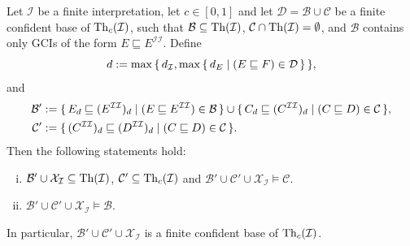 \begin{Theorem}
  \label{thm:unravelling-confident-bases}
  Let $\mathcal{I}$ be a finite interpretation, let $c \in [0,1]$ and let $\mathcal{D} =
  \mathcal{B} \cup \mathcal{C}$ be a finite confident base of $\operatorname{Th}_c(\mathcal{I})$, such
  that $\mathcal{B} \subseteq \operatorname{Th}(\mathcal{I})$, $\mathcal{C} \cap \operatorname{Th}(\mathcal{I}) =
  \emptyset$, and $\mathcal{B}$ contains only GCIs of the form $E \sqsubseteq
  E^{\mathcal{I}\mathcal{I}}$. Define
  \begin{equation*}
    d := \max{\ensuremath{\{\, d_{\mathcal{I}}, \max {\ensuremath{\{\, d_{E} \mid (E \sqsubseteq F) \in
        \mathcal{D} \,\}}} \,\}}},
  \end{equation*}
  and
  \begin{align*}
    \mathcal{B}' &:= {\{\, E_{d} \sqsubseteq (E^{\mathcal{I}\mathcal{I}})_{d} \mid (E
      \sqsubseteq E^{\mathcal{I}\mathcal{I}}) \in \mathcal{B} \,\}} \cup {\ensuremath{\{\, C_{d}
      \sqsubseteq (C^{\mathcal{I}\mathcal{I}})_{d}\mid (C \sqsubseteq D) \in \mathcal{C} \,\}}},\\
    \mathcal{C}' &:= {\{\, (C^{\mathcal{I}\mathcal{I}})_{d} \sqsubseteq
      (D^{\mathcal{I}\mathcal{I}})_{d} \mid (C \sqsubseteq D) \in \mathcal{C} \,\}}.
  \end{align*}
  Then the following statements hold:
  \begin{enumerate}[i. ]
  \item $\mathcal{B}' \cup \mathcal{X}_{\mathcal{I}} \subseteq \operatorname{Th}(\mathcal{I})$,
    $\mathcal{C}' \subseteq \operatorname{Th}_c(\mathcal{I})$ and $\mathcal{B}' \cup \mathcal{C}' \cup
    \mathcal{X}_{\mathcal{I}} \models \mathcal{C}$.
  \item $\mathcal{B}' \cup \mathcal{C}' \cup \mathcal{X}_{\mathcal{I}} \models
    \mathcal{B}$.
  \end{enumerate}
  In particular, $\mathcal{B}' \cup \mathcal{C}' \cup \mathcal{X}_{\mathcal{I}}$ is a
  finite confident \ELbot base of $\operatorname{Th}_c(\mathcal{I})$.
\end{Theorem}


